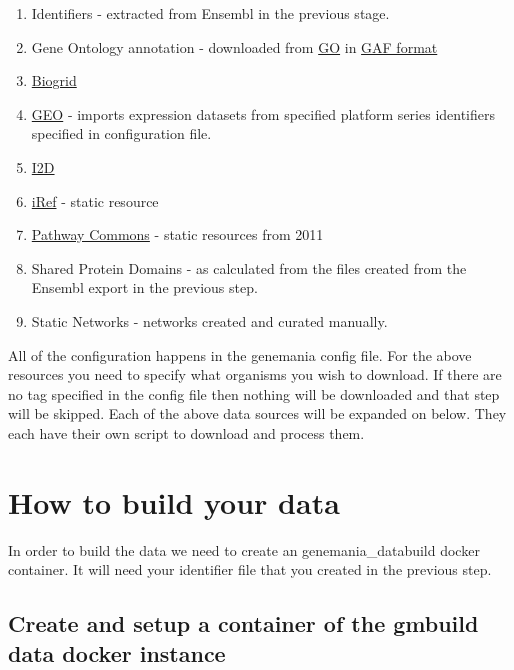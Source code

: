 \documentclass[]{book}
\providecommand{\tightlist}{%
  \setlength{\itemsep}{0pt}\setlength{\parskip}{0pt}}
\begin{document}
\begin{enumerate}
\def\labelenumi{\arabic{enumi}.}
\tightlist
\item
  Identifiers - extracted from Ensembl in the previous stage.
\item
  Gene Ontology annotation - downloaded from
  \href{http://geneontology.org/}{GO} in
  \href{http://geneontology.org/docs/go-annotation-file-gaf-format-2.1/}{GAF
  format}
\item
  \href{https://thebiogrid.org/}{Biogrid}
\item
  \href{https://www.ncbi.nlm.nih.gov/geo/}{GEO} - imports expression
  datasets from specified platform series identifiers specified in
  configuration file.
\item
  \href{http://ophid.utoronto.ca/ophidv2.204/}{I2D}
\item
  \href{https://irefindex.vib.be/wiki/index.php/iRefIndex}{iRef} -
  static resource
\item
  \href{https://www.pathwaycommons.org/}{Pathway Commons} - static
  resources from 2011
\item
  Shared Protein Domains - as calculated from the files created from the
  Ensembl export in the previous step.
\item
  Static Networks - networks created and curated manually.
\end{enumerate}

All of the configuration happens in the genemania config file. For the
above resources you need to specify what organisms you wish to download.
If there are no tag specified in the config file then nothing will be
downloaded and that step will be skipped. Each of the above data sources
will be expanded on below. They each have their own script to download
and process them.

\section{How to build your data}\label{how-to-build-your-data}

In order to build the data we need to create an genemania\_databuild
docker container. It will need your identifier file that you created in
the previous step.

\subsection{Create and setup a container of the gmbuild data docker
instance}\label{create-and-setup-a-container-of-the-gmbuild-data-docker-instance}
\end{document}
